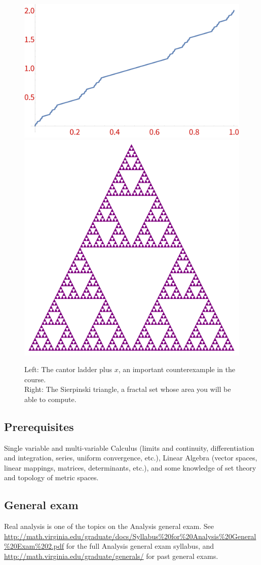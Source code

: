 \documentclass[oneside,11pt]{amsart}
\begin{document}
\begin{figure}[h]
	\includegraphics[height=.35\textwidth]{img/Cantor.pdf}
	\qquad 
	\includegraphics[height=.35\textwidth]{img/Sierp.pdf}
	\caption{Left: The cantor ladder plus $x$, an important counterexample in the course.\\
	Right: The Sierpinski triangle, a fractal set whose area you will be able to compute.}
\end{figure}

\subsection*{Prerequisites}

Single variable and multi-variable Calculus (limits and continuity,
differentiation and integration, series, uniform convergence, etc.), Linear
Algebra (vector spaces, linear mappings, matrices, determinants, etc.), and
some knowledge of set theory and topology of metric spaces.

\subsection*{General exam}
Real analysis is one of the topics on the Analysis general exam.
See \url{http://math.virginia.edu/graduate/docs/Syllabus%20for%20Analysis%20General%20Exam%202.pdf}
for the full Analysis general exam syllabus,
and \url{http://math.virginia.edu/graduate/generals/}
for past general exams.
\end{document}
